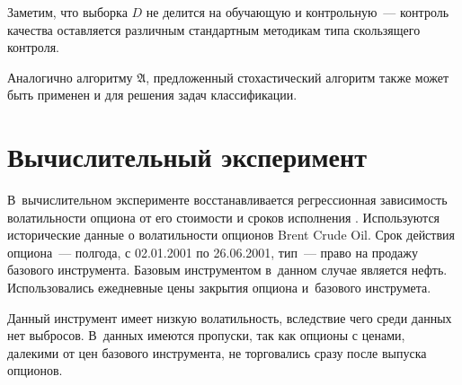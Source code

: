 \documentclass[12pt,a4paper]{article}
\begin{document}
Заметим, что выборка $D$ не делится на обучающую и контрольную~--- контроль
качества оставляется различным стандартным методикам типа скользящего контроля.

Аналогично алгоритму $\mathfrak{A}$, предложенный стохастический
алгоритм также может быть применен и для решения задач классификации.

\section{Вычислительный эксперимент}

В~вычислительном эксперименте восстанавливается регрессионная зависимость
волатильности опциона от его стоимости и сроков исполнения
\cite{daglish07theory,strijov09jct}. Используются исторические данные о
волатильности опционов Brent Crude Oil. Срок действия опциона~--- полгода,
с 02.01.2001 по 26.06.2001, тип~--- право на продажу базового инструмента.
Базовым инструментом в~данном случае является нефть. Использовались
ежедневные цены закрытия опциона и~базового инструмета.

Данный инструмент имеет низкую волатильность, вследствие чего среди данных
нет выбросов. В~данных имеются пропуски, так как опционы с ценами, далекими
от цен базового инструмента, не торговались сразу после выпуска опционов.
\end{document}

